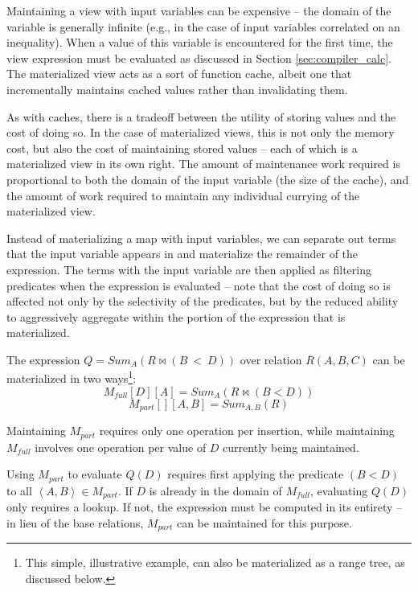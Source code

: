Maintaining a view with input variables can be expensive -- the domain of the variable is generally infinite (e.g., in the case of input variables correlated on an inequality).  When a value of this variable is encountered for the first time, the view expression must be evaluated as discussed in Section \ref{sec:compiler_calc}.  The materialized view acts as a sort of function cache, albeit one that incrementally maintains cached values rather than invalidating them.

As with caches, there is a tradeoff between the utility of storing values and the cost of doing so.  In the case of materialized views, this is not only the memory cost, but also the cost of maintaining stored values -- each of which is a materialized view in its own right.  The amount of maintenance work required is proportional to both the domain of the input variable (the size of the cache), and the amount of work required to maintain any individual currying of the materialized view.  

Instead of materializing a map with input variables, we can separate out terms that the input variable appears in and materialize the remainder of the expression.  The terms with the input variable are then applied as filtering predicates when the expression is evaluated -- note that the cost of doing so is  affected not only by the selectivity of the predicates, but by the reduced ability to aggressively aggregate within the portion of the expression that is materialized.

\begin{example}
The expression $Q = Sum_A(R \bowtie (B~<~D))$ over relation $R(A,B,C)$ can be materialized in two ways\footnote{This simple, illustrative example, can also be materialized as a range tree, as discussed below.}:
$$M_{full}[D][A] = Sum_A(R \bowtie (B < D))$$
$$M_{part}[][A,B] = Sum_{A,B}(R)$$
\end{example}

Maintaining $M_{part}$ requires only one operation per insertion, while maintaining $M_{full}$ involves one operation per value of $D$ currently being maintained.  

Using $M_{part}$ to evaluate $Q(D)$ requires first applying the predicate $(B < D)$ to all $\left<A,B\right> \in M_{part}$.  If $D$ is already in the domain of $M_{full}$, evaluating $Q(D)$ only requires a lookup.  If not, the expression must be computed in its entirety -- in lieu of the base relations, $M_{part}$ can be maintained for this purpose.

